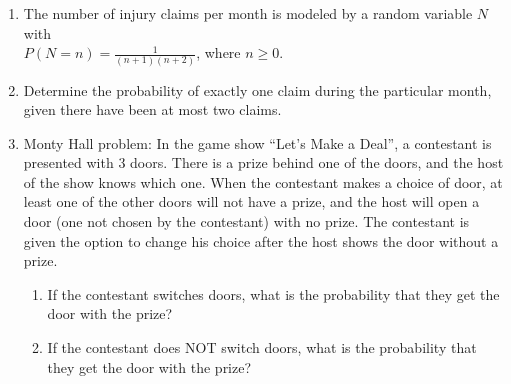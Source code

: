 \documentclass{article}
\begin{document}
\begin{enumerate}
    \item The number of injury claims per month is modeled by a random variable $N$ with \\$P(N = n) = \frac{1}{(n + 1)(n + 2)}$, where $n \ge 0$.%
    \item[] Determine the probability of exactly one claim during the particular month, given there have been at most two claims.\vspace{100pt}
    
    \item Monty Hall problem: In the game show ``Let's Make a Deal'', a contestant is presented with 3 doors. There is a prize behind one of the doors, and the host of the show knows which one. When the contestant makes a choice of door, at least one of the other doors will not have a prize, and the host will open a door (one not chosen by the contestant) with no prize. The contestant is given the option to change his choice after the host shows the door without a prize.%
    \begin{enumerate}
    \item If the contestant switches doors, what is the probability that they get the door with the prize?\vspace{100pt}
    \item If the contestant does NOT switch doors, what is the probability that they get the door with the prize?\vspace{100pt}
    \end{enumerate}
    

\end{enumerate}
\end{document}
